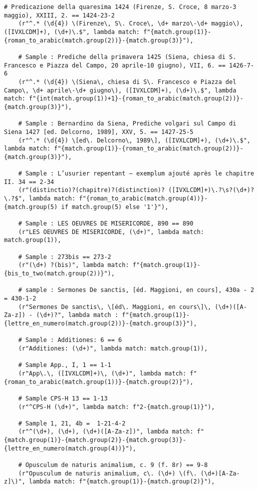 \begin{lstlisting}[breaklines=true]
	# Predicazione della quaresima 1424 (Firenze, S. Croce, 8 marzo-3 maggio), XXIII, 2. == 1424-23-2
	(r"^.* (\d{4}) \(Firenze\, S\. Croce\, \d+ marzo\-\d+ maggio\), ([IVXLCDM]+), (\d+)\.$", lambda match: f"{match.group(1)}-{roman_to_arabic(match.group(2))}-{match.group(3)}"),
	
	# Sample : Prediche della primavera 1425 (Siena, chiesa di S. Francesco e Piazza del Campo, 20 aprile-10 giugno), VII, 6. == 1426-7-6
	(r"^.* (\d{4}) \(Siena\, chiesa di S\. Francesco e Piazza del Campo\, \d+ aprile\-\d+ giugno\), ([IVXLCDM]+), (\d+)\.$", lambda match: f"{int(match.group(1))+1}-{roman_to_arabic(match.group(2))}-{match.group(3)}"),
	
	# Sample : Bernardino da Siena, Prediche volgari sul Campo di Siena 1427 [ed. Delcorno, 1989], XXV, 5. == 1427-25-5
	(r"^.* (\d{4}) \[ed\. Delcorno\, 1989\], ([IVXLCDM]+), (\d+)\.$", lambda match: f"{match.group(1)}-{roman_to_arabic(match.group(2))}-{match.group(3)}"),
	
	# Sample : L’usurier repentant – exemplum ajouté après le chapitre II. 34 == 2-34
	(r"(distinctio)?(chapitre)?(distinction)? ([IVXLCDM]+)\.?\s?(\d+)?\.?$", lambda match: f"{roman_to_arabic(match.group(4))}-{match.group(5) if match.group(5) else '1'}"),
	
	# Sample : LES OEUVRES DE MISERICORDE, 890 == 890
	(r"LES OEUVRES DE MISERICORDE, (\d+)", lambda match: match.group(1)),
	
	# Sample : 273bis == 273-2
	(r"(\d+) ?(bis)", lambda match: f"{match.group(1)}-{bis_to_two(match.group(2))}"),
	
	# sample : Sermones De sanctis, [éd. Maggioni, en cours], 430a - 2 = 430-1-2
	(r"Sermones De sanctis\, \[éd\. Maggioni, en cours\]\, (\d+)([A-Za-z]) - (\d+)?", lambda match : f"{match.group(1)}-{lettre_en_numero(match.group(2))}-{match.group(3)}"),
	
	# Sample : Additiones: 6 == 6
	(r"Additiones: (\d+)", lambda match: match.group(1)),
	
	# Sample App., I, 1 == 1-1
	(r"App\.\, ([IVXLCDM]+)\, (\d+)", lambda match: f"{roman_to_arabic(match.group(1))}-{match.group(2)}"),
	
	# Sample CPS-H 13 == 1-13
	(r"^CPS-H (\d+)", lambda match: f"2-{match.group(1)}"),
	
	# Sample 1, 21, 4b =  1-21-4-2
	(r"^(\d+), (\d+), (\d+)([A-Za-z])", lambda match: f"{match.group(1)}-{match.group(2)}-{match.group(3)}-{lettre_en_numero(match.group(4))}"),
	
	# Opusculum de naturis animalium, c. 9 (f. 8r) == 9-8
	(r"Opusculum de naturis animalium, c\. (\d+) \(f\. (\d+)[A-Za-z]\)", lambda match: f"{match.group(1)}-{match.group(2)}"),
	

\end{lstlisting}
